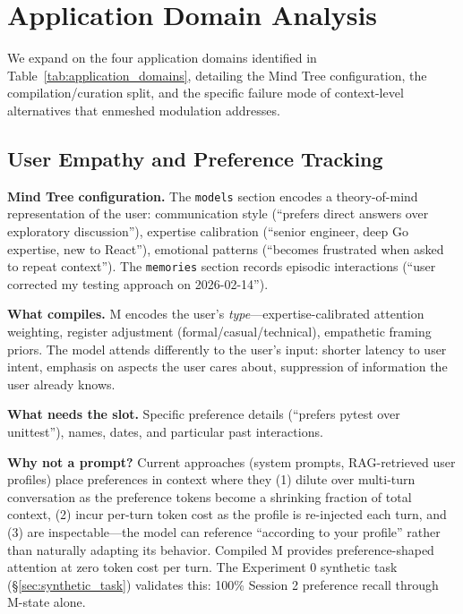 
\section{Application Domain Analysis}
\label{sec:application_domain_details}

We expand on the four application domains identified in Table~\ref{tab:application_domains}, detailing the Mind Tree configuration, the compilation/curation split, and the specific failure mode of context-level alternatives that enmeshed modulation addresses.

\subsection{User Empathy and Preference Tracking}

\textbf{Mind Tree configuration.} The \texttt{models} section encodes a theory-of-mind representation of the user: communication style (``prefers direct answers over exploratory discussion''), expertise calibration (``senior engineer, deep Go expertise, new to React''), emotional patterns (``becomes frustrated when asked to repeat context''). The \texttt{memories} section records episodic interactions (``user corrected my testing approach on 2026-02-14'').

\textbf{What compiles.} M encodes the user's \emph{type}---expertise-calibrated attention weighting, register adjustment (formal/casual/technical), empathetic framing priors. The model attends differently to the user's input: shorter latency to user intent, emphasis on aspects the user cares about, suppression of information the user already knows.

\textbf{What needs the slot.} Specific preference details (``prefers pytest over unittest''), names, dates, and particular past interactions.

\textbf{Why not a prompt?} Current approaches (system prompts, RAG-retrieved user profiles) place preferences in context where they (1) dilute over multi-turn conversation as the preference tokens become a shrinking fraction of total context, (2) incur per-turn token cost as the profile is re-injected each turn, and (3) are inspectable---the model can reference ``according to your profile'' rather than naturally adapting its behavior. Compiled M provides preference-shaped attention at zero token cost per turn. The Experiment 0 synthetic task (\S\ref{sec:synthetic_task}) validates this: 100\% Session 2 preference recall through M-state alone.

